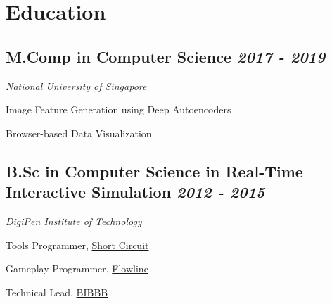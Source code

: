 \documentclass[letterpaper,11pt]{article}
\newcommand{\cvitem}[1]{\hspace{10pt}\vspace{2.5pt} \small\scshape\raggedright \textcolor{item_color}{#1}\\}
\newcommand{\link}[2]{\textcolor{link_color}{\href{#1}{#2}}}
\newcommand{\position}[1]{\vspace{-4pt} \textsl{\footnotesize #1}\\}
\newcommand{\qualifier}[1]{\hfill \textsl{\footnotesize #1}}
\begin{document}
\section{Education}

\subsection{M.Comp in Computer Science \qualifier{2017 - 2019}}
\position{National University of Singapore}
    \cvitem{Image Feature Generation using Deep Autoencoders}
    \cvitem{Browser-based Data Visualization}

\subsection{B.Sc in Computer Science in Real-Time Interactive Simulation \qualifier{2012 - 2015}}
\position{DigiPen Institute of Technology}
    \cvitem{Tools Programmer, \link{http://games.digipen.edu/games/shortcircuit}{Short Circuit}}
    \cvitem{Gameplay Programmer, \link{http://games.digipen.edu/games/flowline}{Flowline}}
    \cvitem{Technical Lead, \link{http://games.digipen.edu/games/bibbb}{BIBBB}}
\end{document}
